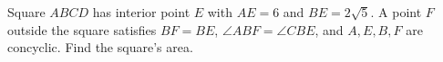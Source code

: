 Square $ABCD$ has interior point $E$ with $AE=6$ and $BE=2\sqrt5$. A point $F$ outside the square satisfies $BF=BE$, $\angle ABF=\angle CBE$, and $A,E,B,F$ are concyclic. Find the square's area.
